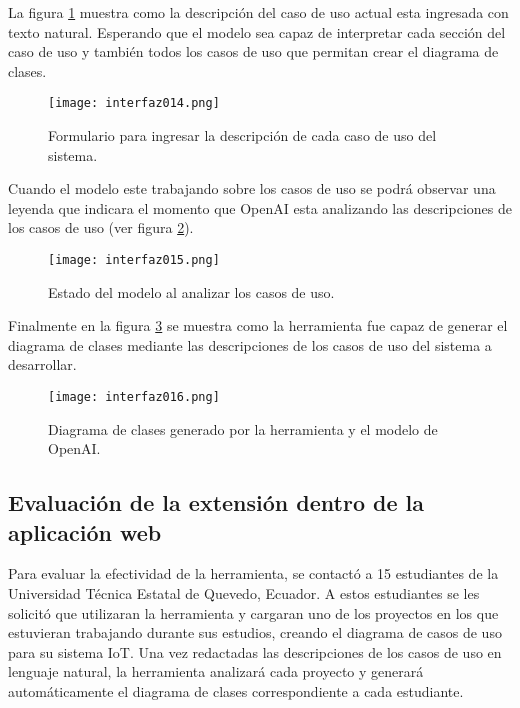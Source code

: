 La figura \ref{fig:cap3_interfaz_014} muestra como la descripción del caso de uso actual esta ingresada con texto natural. Esperando que el modelo sea capaz de interpretar cada sección del caso de uso y también todos los casos de uso que permitan crear el diagrama de clases. 

 \begin{figure}[H]  
	\centering
	\texttt{[image: interfaz014.png]} 
	\caption{Formulario para ingresar la descripción de cada caso de uso del sistema.}
	\label{fig:cap3_interfaz_014}
\end{figure}

Cuando el modelo este trabajando sobre los casos de uso se podrá observar una leyenda que indicara el momento que OpenAI esta analizando las descripciones de los casos de uso (ver figura \ref{fig:cap3_interfaz_015}). 

 \begin{figure}[H]  
	\centering
	\texttt{[image: interfaz015.png]} 
	\caption{Estado del modelo al analizar los casos de uso.}
	\label{fig:cap3_interfaz_015}
\end{figure}

Finalmente en la figura \ref{fig:cap3_interfaz_016} se muestra como la herramienta fue capaz de generar el diagrama de clases mediante las descripciones de los casos de uso del sistema a desarrollar.

 \begin{figure}[H]  
	\centering
	\texttt{[image: interfaz016.png]} 
	\caption{Diagrama de clases generado por la herramienta y el modelo de OpenAI.}
	\label{fig:cap3_interfaz_016}
\end{figure}

\subsection{Evaluación de la extensión dentro de la aplicación web}

Para evaluar la efectividad de la herramienta, se contactó a 15 estudiantes de la Universidad Técnica Estatal de Quevedo, Ecuador. A estos estudiantes se les solicitó que utilizaran la herramienta y cargaran uno de los proyectos en los que estuvieran trabajando durante sus estudios, creando el diagrama de casos de uso para su sistema IoT. Una vez redactadas las descripciones de los casos de uso en lenguaje natural, la herramienta analizará cada proyecto y generará automáticamente el diagrama de clases correspondiente a cada estudiante.

